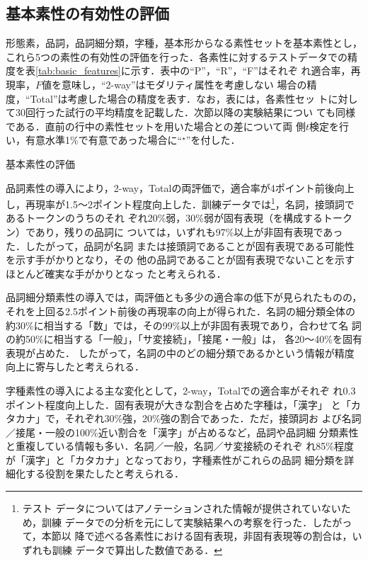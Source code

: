 \documentclass[japanese]{jnlp_1.4}
\begin{document}
\subsection{基本素性の有効性の評価}
\label{sec:exp_basic}

形態素，品詞，品詞細分類，字種，基本形からなる素性セットを基本素性とし，
これら5つの素性の有効性の評価を行った．各素性に対するテストデータでの精
度を表\ref{tab:basic_features}に示す．表中の``P''，``R''，``F''はそれぞ
れ適合率，再現率，$F$値を意味し，``2-way''はモダリティ属性を考慮しない
場合の精度，``Total''は考慮した場合の精度を表す．なお，表には，各素性セッ
トに対して30回行った試行の平均精度を記載した．次節以降の実験結果につい
ても同様である．直前の行中の素性セットを用いた場合との差について両
側$t$検定を行い，有意水準1\%で有意であった場合に``$^\star$''を付した．

\begin{table}[b]
 \caption{基本素性の評価}
 \label{tab:basic_features}

\end{table}

品詞素性の導入により，2-way，Totalの両評価で，適合率が4ポイント前後向上
し，再現率が1.5〜2ポイント程度向上した．訓練データでは\footnote{テスト
  データについてはアノテーションされた情報が提供されていないため，訓練
  データでの分析を元にして実験結果への考察を行った．したがって，本節以
  降で述べる各素性における固有表現，非固有表現等の割合は，いずれも訓練
  データで算出した数値である．}，名詞，接頭詞であるトークンのうちのそれ
ぞれ20\%弱，30\%弱が固有表現（を構成するトークン）であり，残りの品詞に
ついては，いずれも97\%以上が非固有表現であった．したがって，品詞が名詞
または接頭詞であることが固有表現である可能性を示す手がかりとなり，その
他の品詞であることが固有表現でないことを示すほとんど確実な手がかりとなっ
たと考えられる．

品詞細分類素性の導入では，両評価とも多少の適合率の低下が見られたものの，
それを上回る2.5ポイント前後の再現率の向上が得られた．名詞の細分類全体の
約30\%に相当する「数」では，その99\%以上が非固有表現であり，合わせて名
詞の約50\%に相当する「一般」，「サ変接続」，「接尾・一般」は，
各20〜40\%を固有表現が占めた．
したがって，名詞の中のどの細分類であるかという情報が精度向上に寄与したと考えられる．

字種素性の導入による主な変化として，2-way，Totalでの適合率がそれぞ
れ0.3ポイント程度向上した．固有表現が大きな割合を占めた字種は，「漢字」
と「カタカナ」で，それぞれ30\%強，20\%強の割合であった．ただ，接頭詞お
よび名詞／接尾・一般の100\%近い割合を「漢字」が占めるなど，品詞や品詞細
分類素性と重複している情報も多い．名詞／一般，名詞／サ変接続のそれぞ
れ85\%程度が「漢字」と「カタカナ」となっており，字種素性がこれらの品詞
細分類を詳細化する役割を果たしたと考えられる．
\end{document}
